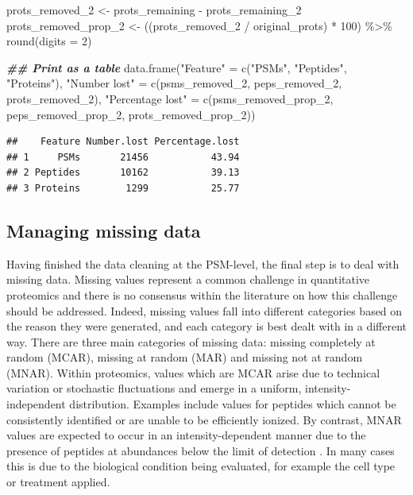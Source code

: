 \documentclass[9pt,a4paper,]{extarticle}
\newenvironment{Shaded}{\begin{snugshade}}{\end{snugshade}}
\newcommand{\AttributeTok}[1]{\textcolor[rgb]{0.77,0.63,0.00}{#1}}
\newcommand{\DecValTok}[1]{\textcolor[rgb]{0.00,0.00,0.81}{#1}}
\newcommand{\DocumentationTok}[1]{\textcolor[rgb]{0.56,0.35,0.01}{\textbf{\textit{#1}}}}
\newcommand{\FunctionTok}[1]{\textcolor[rgb]{0.00,0.00,0.00}{#1}}
\newcommand{\NormalTok}[1]{#1}
\newcommand{\OtherTok}[1]{\textcolor[rgb]{0.56,0.35,0.01}{#1}}
\newcommand{\SpecialCharTok}[1]{\textcolor[rgb]{0.00,0.00,0.00}{#1}}
\newcommand{\StringTok}[1]{\textcolor[rgb]{0.31,0.60,0.02}{#1}}
\begin{document}
\begin{Shaded}
\begin{Highlighting}[]
\NormalTok{prots\_removed\_2 }\OtherTok{\textless{}{-}}\NormalTok{ prots\_remaining }\SpecialCharTok{{-}}\NormalTok{ prots\_remaining\_2}
\NormalTok{prots\_removed\_prop\_2 }\OtherTok{\textless{}{-}}\NormalTok{ ((prots\_removed\_2 }\SpecialCharTok{/}\NormalTok{ original\_prots) }\SpecialCharTok{*} \DecValTok{100}\NormalTok{) }\SpecialCharTok{\%\textgreater{}\%}
  \FunctionTok{round}\NormalTok{(}\AttributeTok{digits =} \DecValTok{2}\NormalTok{)}


\DocumentationTok{\#\# Print as a table}
\FunctionTok{data.frame}\NormalTok{(}\StringTok{"Feature"} \OtherTok{=} \FunctionTok{c}\NormalTok{(}\StringTok{"PSMs"}\NormalTok{,}
                         \StringTok{"Peptides"}\NormalTok{,}
                         \StringTok{"Proteins"}\NormalTok{),}
           \StringTok{"Number lost"} \OtherTok{=} \FunctionTok{c}\NormalTok{(psms\_removed\_2,}
\NormalTok{                             peps\_removed\_2,}
\NormalTok{                             prots\_removed\_2),}
           \StringTok{"Percentage lost"} \OtherTok{=} \FunctionTok{c}\NormalTok{(psms\_removed\_prop\_2,}
\NormalTok{                                 peps\_removed\_prop\_2,}
\NormalTok{                                 prots\_removed\_prop\_2))}
\end{Highlighting}
\end{Shaded}

\begin{verbatim}
##    Feature Number.lost Percentage.lost
## 1     PSMs       21456           43.94
## 2 Peptides       10162           39.13
## 3 Proteins        1299           25.77
\end{verbatim}

\hypertarget{managing-missing-data}{%
\subsection{Managing missing data}\label{managing-missing-data}}

Having finished the data cleaning at the PSM-level, the final step is to deal
with missing data. Missing values represent a common challenge in quantitative
proteomics and there is no consensus within the literature on how this challenge
should be addressed. Indeed, missing values fall into different categories based
on the reason they were generated, and each category is best dealt with in a
different way. There are three main categories of missing data: missing
completely at random (MCAR), missing at random (MAR) and missing not at random
(MNAR). Within proteomics, values which are MCAR arise due to technical
variation or stochastic fluctuations and emerge in a uniform,
intensity-independent distribution. Examples include values for peptides which
cannot be consistently identified or are unable to be efficiently ionized. By
contrast, MNAR values are expected to occur in an intensity-dependent manner due
to the presence of peptides at abundances below the limit of detection
\citep{Karpievitch2009, Lazar2016, QFeat}. In many cases this is due to the biological
condition being evaluated, for example the cell type or treatment applied.
\end{document}
